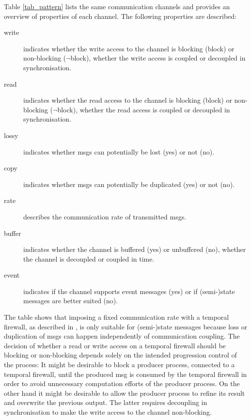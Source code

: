 Table \ref{tab_pattern} lists the same communication channels and provides an overview of properties of each channel.
The following properties are described:
\begin{description}
    \item[write] indicates whether the write access to the channel is blocking (block) or non-blocking ($\neg$block), \ie whether the write access is coupled or decoupled in synchronisation.
    \item[read] indicates whether the read access to the channel is blocking (block) or non-blocking ($\neg$block), \ie whether the read access is coupled or decoupled in synchronisation.
    \item[lossy] indicates whether \glspl*{msg} can potentially be lost (yes) or not (no).
    \item[copy] indicates whether \glspl*{msg} can potentially be duplicated (yes) or not (no).
    \item[rate] describes the communication rate of transmitted \glspl*{msg}.
    \item[buffer] indicates whether the channel is buffered (yes) or unbuffered (no), \ie whether the channel is decoupled or coupled in time.
    \item[event] indicates if the channel supports event messages (yes) or if (semi-)state messages are better suited (no).
\end{description}

The table shows that imposing a fixed communication rate with a temporal firewall, as described in \Sect{\ref{sect_tcm_time_tt}}, is only suitable for (semi-)state messages because loss or duplication of \glspl*{msg} can happen independently of communication coupling.
The decision of whether a read or write access on a temporal firewall should be blocking or non-blocking depends solely on the intended progression control of the process:
It might be desirable to block a producer process, connected to a temporal firewall, until the produced \gls*{msg} is consumed by the temporal firewall in order to avoid unnecessary computation efforts of the producer process.
On the other hand it might be desirable to allow the producer process to refine its result and overwrite the previous output.
The latter requires decoupling in synchronisation to make the write access to the channel non-blocking.

